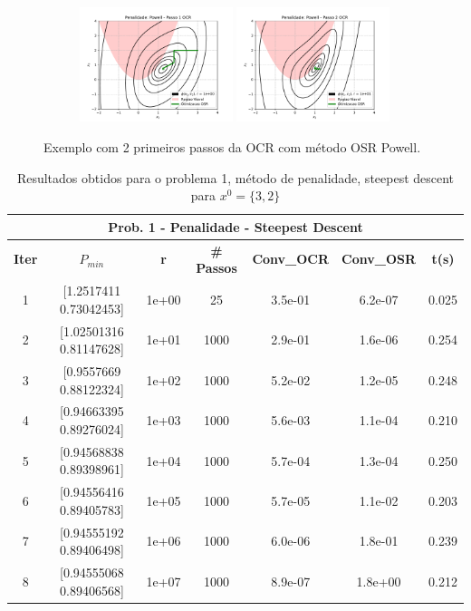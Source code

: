 \documentclass[10pt, a4paper]{article}
\begin{document}
\begin{figure}[H]
  \centering
  \begin{subfigure}[b]{\textwidth}
    \includegraphics[width=0.49\textwidth]{fig_p1/Penalidade_Powell_1.pdf}
    \includegraphics[width=0.49\textwidth]{fig_p1/Penalidade_Powell_2.pdf}
  \end{subfigure}
  \caption{Exemplo com 2 primeiros passos da OCR com método OSR Powell. }
\end{figure}

\vspace{5mm}
\begin{table}[H]
  \begin{center}
    \begin{tabular}{c|c|c|c|c|c|c}
      \multicolumn{7}{c}{\textbf{Prob. 1 - Penalidade - Steepest Descent}}\\
      \hline
      \textbf{Iter} & \textbf{$P_{min}$} & \textbf{r} & \textbf{\# Passos} & \textbf{Conv\_OCR} & \textbf{Conv\_OSR} & \textbf{t(s)}\\
      \hline
        1& [1.2517411  0.73042453]& 1e+00& 25& 3.5e-01& 6.2e-07& 0.025    \\
        2& [1.02501316 0.81147628]& 1e+01& 1000& 2.9e-01& 1.6e-06& 0.254\\
        3& [0.9557669  0.88122324]& 1e+02& 1000& 5.2e-02& 1.2e-05& 0.248\\
        4& [0.94663395 0.89276024]& 1e+03& 1000& 5.6e-03& 1.1e-04& 0.210\\
        5& [0.94568838 0.89398961]& 1e+04& 1000& 5.7e-04& 1.3e-04& 0.250\\
        6& [0.94556416 0.89405783]& 1e+05& 1000& 5.7e-05& 1.1e-02& 0.203\\
        7& [0.94555192 0.89406498]& 1e+06& 1000& 6.0e-06& 1.8e-01& 0.239\\
        8& [0.94555068 0.89406568]& 1e+07& 1000& 8.9e-07& 1.8e+00& 0.212\\
    \end{tabular}
  \end{center}
  \caption{Resultados obtidos para o problema 1, método de penalidade, steepest descent para $x^0=\{3,2\}$}
\end{table}
\end{document}
